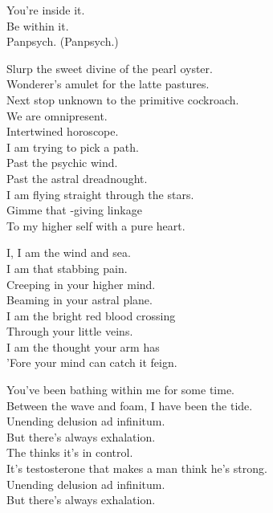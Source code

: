 You're inside it. \\
Be within it. \\
Panpsych. (Panpsych.) \\


Slurp the sweet divine of the pearl oyster. \\
Wonderer's amulet for the latte pastures. \\
Next stop unknown to the primitive cockroach. \\
We are omnipresent. \\
Intertwined horoscope. \\

I am trying to pick a path. \\
Past the psychic wind. \\
Past the astral dreadnought. \\
I am flying straight through the stars. \\
Gimme that -giving linkage \\
To my higher self with a pure heart. \\


I, I am the wind and sea. \\
I am that stabbing pain. \\
Creeping in your higher mind. \\
Beaming in your astral plane. \\
I am the bright red blood crossing \\
Through your little veins. \\
I am the thought your arm has \\
'Fore your mind can catch it feign. \\


You've been bathing within me for some time. \\
Between the wave and foam, I have been the tide. \\
Unending delusion ad infinitum. \\
But there's always exhalation. \\
The  thinks it's in control. \\
It's testosterone that makes a man think he's strong. \\
Unending delusion ad infinitum. \\
But there's always exhalation. \\

